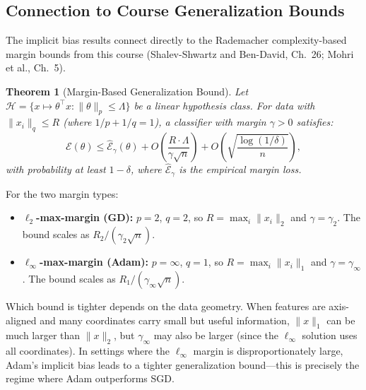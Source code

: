 \documentclass{article}
\newtheorem{theorem}{Theorem}
\begin{document}
\subsection{Connection to Course Generalization Bounds}
\label{sec:bounds}

The implicit bias results connect directly to the Rademacher complexity-based margin bounds from this course (Shalev-Shwartz and Ben-David, Ch.\ 26; Mohri et al., Ch.\ 5).

\begin{theorem}[Margin-Based Generalization Bound]
\label{thm:margin_bound}
Let $\mathcal{H} = \{x \mapsto \theta^\top x : \|\theta\|_p \leq \Lambda\}$ be a linear hypothesis class. For data with $\|x_i\|_q \leq R$ (where $1/p + 1/q = 1$), a classifier with margin $\gamma > 0$ satisfies:
\begin{equation}
    \mathcal{E}(\theta) \leq \hat{\mathcal{E}}_\gamma(\theta) + O\left(\frac{R \cdot \Lambda}{\gamma \sqrt{n}}\right) + O\left(\sqrt{\frac{\log(1/\delta)}{n}}\right),
    \label{eq:margin_bound}
\end{equation}
with probability at least $1 - \delta$, where $\hat{\mathcal{E}}_\gamma$ is the empirical margin loss.
\end{theorem}

For the two margin types:
\begin{itemize}[leftmargin=*]
    \item \textbf{$\ell_2$-max-margin (GD):} $p = 2$, $q = 2$, so $R = \max_i \|x_i\|_2$ and $\gamma = \gamma_2$. The bound scales as $R_2 / (\gamma_2 \sqrt{n})$.
    \item \textbf{$\ell_\infty$-max-margin (Adam):} $p = \infty$, $q = 1$, so $R = \max_i \|x_i\|_1$ and $\gamma = \gamma_\infty$. The bound scales as $R_1 / (\gamma_\infty \sqrt{n})$.
\end{itemize}

Which bound is tighter depends on the data geometry. When features are axis-aligned and many coordinates carry small but useful information, $\|x\|_1$ can be much larger than $\|x\|_2$, but $\gamma_\infty$ may also be larger (since the $\ell_\infty$ solution uses all coordinates). In settings where the $\ell_\infty$ margin is disproportionately large, Adam's implicit bias leads to a tighter generalization bound---this is precisely the regime where Adam outperforms SGD.
\end{document}
